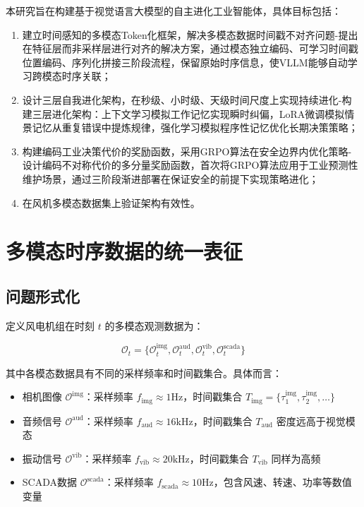 \documentclass[12pt,a4paper]{article}
\begin{document}
本研究旨在构建基于视觉语言大模型的自主进化工业智能体，具体目标包括：

\begin{enumerate}
    \item 建立时间感知的多模态Token化框架，解决多模态数据时间戳不对齐问题-提出在特征层而非采样层进行对齐的解决方案，通过模态独立编码、可学习时间戳位置编码、序列化拼接三阶段流程，保留原始时序信息，使VLLM能够自动学习跨模态时序关联；
    \item 设计三层自我进化架构，在秒级、小时级、天级时间尺度上实现持续进化-构建三层进化架构：上下文学习模拟工作记忆实现瞬时纠偏，LoRA微调模拟情景记忆从重复错误中提炼规律，强化学习模拟程序性记忆优化长期决策策略；
    \item 构建编码工业决策代价的奖励函数，采用GRPO算法在安全边界内优化策略-设计编码不对称代价的多分量奖励函数，首次将GRPO算法应用于工业预测性维护场景，通过三阶段渐进部署在保证安全的前提下实现策略进化；
    \item 在风机多模态数据集上验证架构有效性。
\end{enumerate}


\section{多模态时序数据的统一表征}

\subsection{问题形式化}

定义风电机组在时刻 \(t\) 的多模态观测数据为：

\[
\mathcal{O}_t = \{ \mathcal{O}_t^{\text{img}}, \mathcal{O}_t^{\text{aud}}, \mathcal{O}_t^{\text{vib}}, \mathcal{O}_t^{\text{scada}} \}
\]

其中各模态数据具有不同的采样频率和时间戳集合。具体而言：

\begin{itemize}
    \item 相机图像 \(\mathcal{O}^{\text{img}}\)：采样频率 \(f_{\text{img}} \approx 1\text{Hz}\)，时间戳集合 \(T_{\text{img}} = \{\tau_1^{\text{img}}, \tau_2^{\text{img}}, \ldots\}\)
    \item 音频信号 \(\mathcal{O}^{\text{aud}}\)：采样频率 \(f_{\text{aud}} \approx 16\text{kHz}\)，时间戳集合 \(T_{\text{aud}}\) 密度远高于视觉模态
    \item 振动信号 \(\mathcal{O}^{\text{vib}}\)：采样频率 \(f_{\text{vib}} \approx 20\text{kHz}\)，时间戳集合 \(T_{\text{vib}}\) 同样为高频
    \item SCADA数据 \(\mathcal{O}^{\text{scada}}\)：采样频率 \(f_{\text{scada}} \approx 10\text{Hz}\)，包含风速、转速、功率等数值变量
\end{itemize}
\end{document}
